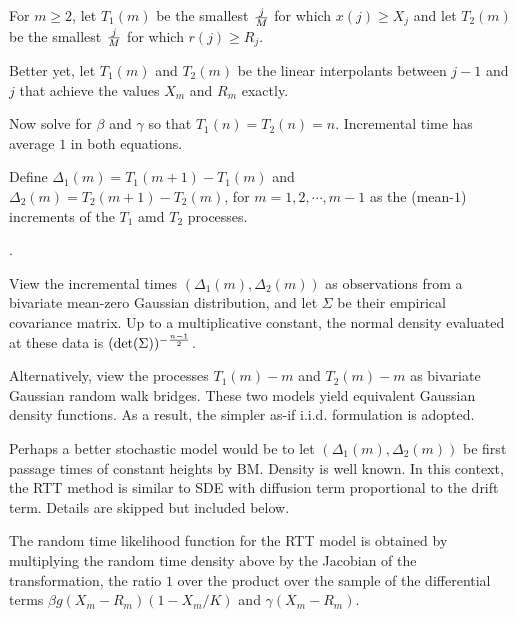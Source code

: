\documentclass{article}
\begin{document}
\bigskip

\noindent For $m \ge 2$, let $T_1(m)$ be the smallest ${j \over M}$ for which $x(j) \ge X_j$ and let $T_2(m)$ be the smallest ${j \over M}$ for which $r(j) \ge R_j$.

\bigskip

\noindent Better yet, let $T_1(m)$ and $T_2(m)$ be the linear interpolants between $j-1$ and $j$ that achieve the values $X_m$ and $R_m$ exactly.

\bigskip

\noindent Now solve for $\beta$ and $\gamma$ so that $T_1(n)=T_2(n)=n$. Incremental time has average $1$ in both equations. 

\bigskip

\noindent Define $\Delta_1(m)=T_1(m+1)-T_1(m)$ and $\Delta_2(m)=T_2(m+1)-T_2(m)$, for $m=1, 2, \cdots,m-1$ as the (mean-$1$) increments of the $T_1$ amd $T_2$ processes.

\newpage

. 

\bigskip

\noindent View the incremental times $(\Delta_1(m),\Delta_2(m))$ as observations from a bivariate mean-zero Gaussian distribution, and let $\Sigma$ be their empirical covariance matrix. Up to a multiplicative constant, the normal density evaluated at these data is $(\det(\Sigma))^{-{{n-1} \over 2}}$.

\bigskip

\noindent Alternatively, view the processes $T_1(m)-m$ and $T_2(m)-m$ as bivariate Gaussian random walk bridges.
These two models yield equivalent Gaussian density functions. As a result, the simpler as-if i.i.d. formulation is adopted. 

\bigskip

\noindent Perhaps a better stochastic model would be to let $(\Delta_1(m),\Delta_2(m))$ be first passage times of constant heights by BM. Density is well known. In this context, the RTT method is similar to SDE with diffusion term proportional to the drift term. Details are skipped but included below.

\bigskip

\noindent The random time likelihood function for the RTT model is obtained by multiplying the random time density above by the Jacobian of the transformation, the ratio $1$ over the product over the sample of the differential terms $\beta g(X_m-R_m)(1-X_m/K)$ and $\gamma (X_m-R_m)$.
\end{document}
